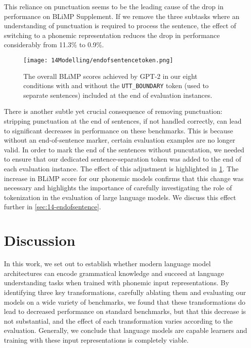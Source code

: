 This reliance on punctuation seems to be the leading cause of the drop in performance on BLiMP Supplement. If we remove the three subtasks where an understanding of punctuation is required to process the sentence, the effect of switching to a phonemic representation reduces the drop in performance considerably from 11.3\% to 0.9\%.

\begin{figure}[t]
    \centering
    \texttt{[image: 14Modelling/endofsentencetoken.png]}
    \caption{The overall BLiMP scores achieved by GPT-2 in our eight conditions with and without the \texttt{UTT\_BOUNDARY} token (used to separate sentences) included at the end of evaluation instances.}
    \label{fix:14-endofsentencetoken}
\end{figure}

There is another subtle yet crucial consequence of removing punctuation: stripping punctuation at the end of sentences, if not handled correctly, can lead to significant decreases in performance on these benchmarks. This is because without an end-of-sentence marker, certain evaluation examples are no longer valid. In order to mark the end of the sentences without puncutation, we needed to ensure that our dedicated sentence-separation token was added to the end of each evaluation instance. The effect of this adjustment is highlighted in \cref{fix:14-endofsentencetoken}. The increase in BLiMP score for our phonemic models confirms that this change was necessary and highlights the importance of carefully investigating the role of tokenization in the evaluation of large language models. We discuss this effect further in \cref{sec:14-endofsentence}.

\section{Discussion}
\label{sec:14-gap}

In this work, we set out to establish whether modern language model architectures can encode grammatical knowledge and succeed at language understanding tasks when trained with phonemic input representations. By identifying three key transformations, carefully ablating them and evaluating our models on a wide variety of benchmarks, we found that these transformations do lead to decreased performance on standard benchmarks, but that this decrease is not substantial, and the effect of each transformation varies according to the evaluation. Generally, we conclude that language models are capable learners and training with these input representations is completely viable.

